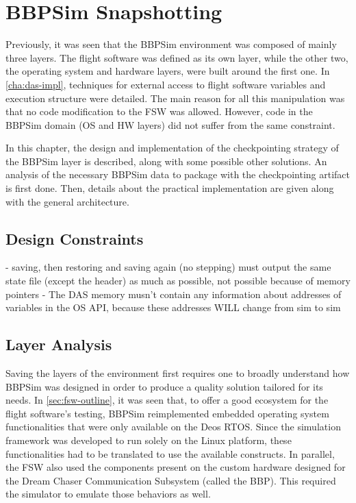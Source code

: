 {
\setlength{\parindent}{2em}
\chapter{BBPSim Snapshotting}\label{cha:bbpsim-impl}
Previously, it was seen that the \gls{BBPSim} environment was composed of mainly three layers. The flight software was defined as its own layer, while the other two, the operating system and hardware layers, were built around the first one. In \autoref{cha:das-impl}, techniques for external access to flight software variables and execution structure were detailed. The main reason for all this manipulation was that no code modification to the FSW was allowed. However, code in the BBPSim domain (OS and HW layers) did not suffer from the same constraint. 

In this chapter, the design and implementation of the checkpointing strategy of the BBPSim layer is described, along with some possible other solutions. An analysis of the necessary BBPSim data to package with the checkpointing artifact is first done. Then, details about the practical implementation are given along with the general architecture. 

\section{Design Constraints}
- saving, then restoring and saving again (no stepping) must output the same state file (except the header) as much as possible, not possible because of memory pointers
- The DAS memory musn't contain any information about addresses of variables in the OS API, because these addresses WILL change from sim to sim

\section{Layer Analysis}
Saving the layers of the environment first requires one to broadly understand how BBPSim was designed in order to produce a quality solution tailored for its needs. In \autoref{sec:fsw-outline}, it was seen that, to offer a good ecosystem for the flight software's testing, \gls{BBPSim} reimplemented embedded operating system functionalities that were only available on the Deos \gls{RTOS}. Since the simulation framework was developed to run solely on the Linux platform, these functionalities had to be translated to use the available constructs. In parallel, the FSW also used the components present on the custom hardware designed for the Dream Chaser Communication Subsystem (called the \gls{BBP}). This required the simulator to emulate those behaviors as well.

}

